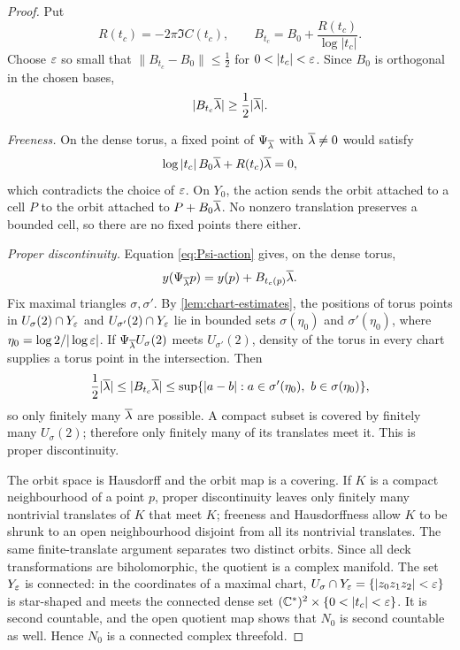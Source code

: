 \begin{proof}
Put
\[
 R(t_c)=-2\pi\Im C(t_c),
 \qquad
 B_{t_c}=B_0+\frac{R(t_c)}{\log|t_c|}.
\]
Choose $\varepsilon$ so small that
$\|B_{t_c}-B_0\|\leq\frac12$ for $0<|t_c|<\eps$.
Since $B_0$ is orthogonal in the chosen bases,
\begin{equation}\label{eq:Bt-bound}
 |B_{t_c}\overline\lambda|\geq\frac12|\overline\lambda|.
\end{equation}

\smallskip
\noindent\emph{Freeness.}
On the dense torus, a fixed point of $\Psi_{\overline\lambda}$ with
$\overline\lambda\ne0$ would satisfy
\[
 \log|t_c|\,B_0\overline\lambda+R(t_c)\overline\lambda=0,
\]
which contradicts the choice of $\varepsilon$.  On $Y_0$, the action sends the
orbit attached to a cell $P$ to the orbit attached to
$P+B_0\overline\lambda$.  No nonzero translation preserves a bounded cell, so
there are no fixed points there either.

\smallskip
\noindent\emph{Proper discontinuity.}
Equation \eqref{eq:Psi-action} gives, on the dense torus,
\begin{equation}\label{eq:position-translation}
 y(\Psi_{\overline\lambda}p)=y(p)+B_{t_c(p)}\overline\lambda.
\end{equation}
Fix maximal triangles $\sigma,\sigma'$.  By
\cref{lem:chart-estimates}, the positions of torus points in
$U_\sigma(2)\cap Y_\varepsilon$ and $U_{\sigma'}(2)\cap Y_\varepsilon$ lie in
bounded sets $\sigma(\eta_0)$ and $\sigma'(\eta_0)$, where
$\eta_0=\log2/|\log\varepsilon|$.  If
$\Psi_{\overline\lambda}U_\sigma(2)$ meets $U_{\sigma'}(2)$, density of
the torus in every chart supplies a torus point in the intersection.
Then
\[
 \frac12|\overline\lambda|
 \leq |B_{t_c}\overline\lambda|
 \leq
 \sup\{|a-b|:a\in\sigma'(\eta_0),\ b\in\sigma(\eta_0)\},
\]
so only finitely many $\overline\lambda$ are possible.  A compact subset is
covered by finitely many $U_\sigma(2)$; therefore only finitely many of
its translates meet it.  This is proper discontinuity.

The orbit space is Hausdorff and the orbit map is a covering.  If $K$ is
a compact neighbourhood of a point $p$, proper discontinuity leaves only
finitely many nontrivial translates of $K$ that meet $K$; freeness and
Hausdorffness allow $K$ to be shrunk to an open neighbourhood disjoint
from all its nontrivial translates.  The same finite-translate argument
separates two distinct orbits.  Since all deck transformations are
biholomorphic, the quotient is a complex manifold.  The set $Y_\varepsilon$ is connected: in the coordinates of a maximal chart,
$U_\sigma\cap Y_\varepsilon=\{|z_0z_1z_2|<\varepsilon\}$ is star-shaped and meets
the connected dense set
$(\C^*)^2\times\{0<|t_c|<\eps\}$.  It is second countable, and the open
quotient map shows that $N_0$ is second countable as well.  Hence $N_0$ is
a connected complex threefold.


\end{proof}
